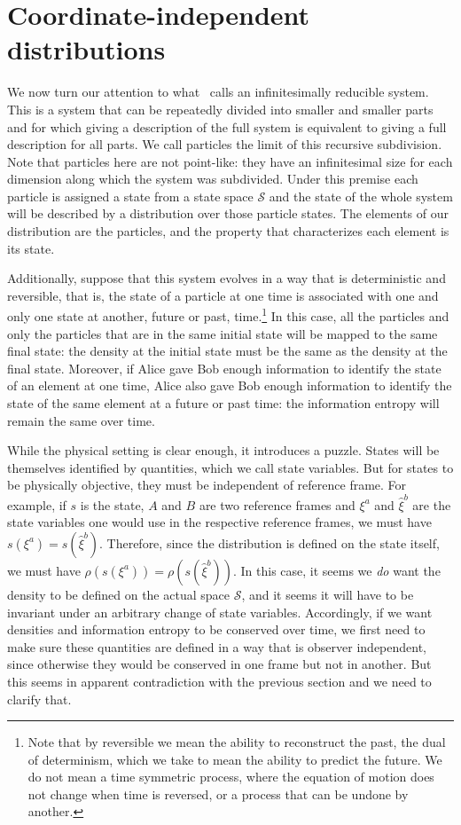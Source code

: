 \documentclass[11pt]{elsarticle}
\begin{document}
\section{Coordinate-independent distributions}

We now turn our attention to what~\cite{AoPPhy1} calls an infinitesimally reducible system. This is a system that can be repeatedly divided into smaller and smaller parts and for which giving a description of the full system is equivalent to giving a full description for all parts. We call particles the limit of this recursive subdivision. Note that particles here are not point-like: they have an infinitesimal size for each dimension along which the system was subdivided. Under this premise each particle is assigned a state from a state space $\mathcal{S}$ and the state of the whole system will be described by a distribution over those particle states. The elements of our distribution are the particles, and the property that characterizes each element is its state.

Additionally, suppose that this system evolves in a way that is deterministic and reversible, that is, the state of a particle at one time is associated with one and only one state at another, future or past, time.\footnote{Note that by reversible we mean the ability to reconstruct the past, the dual of determinism, which we take to mean the ability to predict the future. We do not mean a time symmetric process, where the equation of motion does not change when time is reversed, or a process that can be undone by another.} In this case, all the particles and only the particles that are in the same initial state will be mapped to the same final state: the density at the initial state must be the same as the density at the final state. Moreover, if Alice gave Bob enough information to identify the state of an element at one time, Alice also gave Bob enough information to identify the state of the same element at a future or past time: the information entropy will remain the same over time.

While the physical setting is clear enough, it introduces a puzzle. States will be themselves identified by quantities, which we call state variables. But for states to be physically objective, they must be independent of reference frame. For example, if $s$ is the state, $A$ and $B$ are two reference frames and $\xi^a$ and $\hat{\xi}^b$ are the state variables one would use in the respective reference frames, we must have $s(\xi^a) = s(\hat{\xi}^b)$.  Therefore, since the distribution is defined on the state itself, we must have $\rho(s(\xi^a))=\rho(s(\hat{\xi}^b))$. In this case, it seems we \emph{do} want the density to be defined on the actual space $\mathcal{S}$, and it seems it will have to be invariant under an arbitrary change of state variables. Accordingly, if we want densities and information entropy to be conserved over time, we first need to make sure these quantities are defined in a way that is observer independent, since otherwise they would be conserved in one frame but not in another. But this seems in apparent contradiction with the previous section and we need to clarify that.
\end{document}
